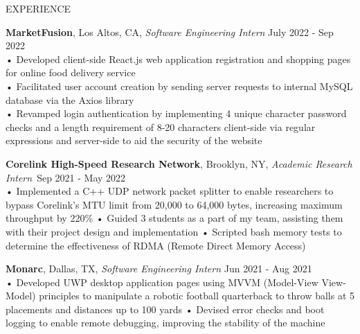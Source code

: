 \documentclass{resume} %
\begin{document}
\begin{rSection}{EXPERIENCE}

\textbf{MarketFusion}, Los Altos, CA, {\emph{Software Engineering Intern}} \hfill July 2022 - Sep 2022 \\
• Developed client-side React.js web application registration and shopping pages for online food delivery service \\
• Facilitated user account creation by sending server requests to internal MySQL database via the Axios library \\
• Revamped login authentication by implementing 4 unique character password checks and a length requirement of 8-20 characters client-side via regular expressions and server-side to aid the security of the website 

\textbf{Corelink High-Speed Research Network}, Brooklyn, NY, {\emph{Academic Research Intern}}\ \hfill Sep 2021 - May 2022 \\
• Implemented a C++ UDP network packet splitter to enable researchers to bypass Corelink's MTU limit from 20,000 to 64,000 bytes, increasing maximum throughput by 220\% \newline
• Guided 3 students as a part of my team, assisting them with their project design and implementation \newline
• Scripted bash memory tests to determine the effectiveness of RDMA (Remote Direct Memory Access) 

\textbf{Monarc}, Dallas, TX, {\emph{Software Engineering Intern}} \hfill Jun 2021 - Aug 2021 \\
• Developed UWP desktop application pages using MVVM (Model-View View-Model) principles to manipulate a robotic football quarterback to throw balls at 5 placements and distances up to 100 yards\newline
• Devised error checks and boot logging to enable remote debugging, improving the stability of the machine \smallskip
\end{rSection} 
\end{document}
